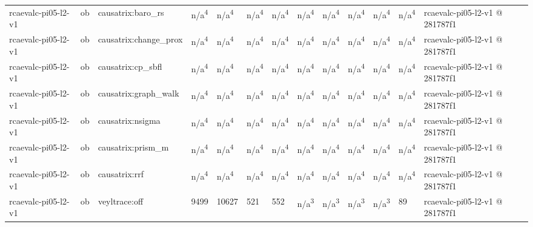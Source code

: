 \begin{table}[t]
\begin{tabular}{lllllllllllll}
rcaevalc-pi05-l2-v1 & ob & causatrix:baro\_rs & n/a\textsuperscript{4} & n/a\textsuperscript{4} & n/a\textsuperscript{4} & n/a\textsuperscript{4} & n/a\textsuperscript{4} & n/a\textsuperscript{4} & n/a\textsuperscript{4} & n/a\textsuperscript{4} & n/a\textsuperscript{4} & rcaevalc-pi05-l2-v1 @ 281787f1 \\
rcaevalc-pi05-l2-v1 & ob & causatrix:change\_prox & n/a\textsuperscript{4} & n/a\textsuperscript{4} & n/a\textsuperscript{4} & n/a\textsuperscript{4} & n/a\textsuperscript{4} & n/a\textsuperscript{4} & n/a\textsuperscript{4} & n/a\textsuperscript{4} & n/a\textsuperscript{4} & rcaevalc-pi05-l2-v1 @ 281787f1 \\
rcaevalc-pi05-l2-v1 & ob & causatrix:cp\_sbfl & n/a\textsuperscript{4} & n/a\textsuperscript{4} & n/a\textsuperscript{4} & n/a\textsuperscript{4} & n/a\textsuperscript{4} & n/a\textsuperscript{4} & n/a\textsuperscript{4} & n/a\textsuperscript{4} & n/a\textsuperscript{4} & rcaevalc-pi05-l2-v1 @ 281787f1 \\
rcaevalc-pi05-l2-v1 & ob & causatrix:graph\_walk & n/a\textsuperscript{4} & n/a\textsuperscript{4} & n/a\textsuperscript{4} & n/a\textsuperscript{4} & n/a\textsuperscript{4} & n/a\textsuperscript{4} & n/a\textsuperscript{4} & n/a\textsuperscript{4} & n/a\textsuperscript{4} & rcaevalc-pi05-l2-v1 @ 281787f1 \\
rcaevalc-pi05-l2-v1 & ob & causatrix:nsigma & n/a\textsuperscript{4} & n/a\textsuperscript{4} & n/a\textsuperscript{4} & n/a\textsuperscript{4} & n/a\textsuperscript{4} & n/a\textsuperscript{4} & n/a\textsuperscript{4} & n/a\textsuperscript{4} & n/a\textsuperscript{4} & rcaevalc-pi05-l2-v1 @ 281787f1 \\
rcaevalc-pi05-l2-v1 & ob & causatrix:prism\_m & n/a\textsuperscript{4} & n/a\textsuperscript{4} & n/a\textsuperscript{4} & n/a\textsuperscript{4} & n/a\textsuperscript{4} & n/a\textsuperscript{4} & n/a\textsuperscript{4} & n/a\textsuperscript{4} & n/a\textsuperscript{4} & rcaevalc-pi05-l2-v1 @ 281787f1 \\
rcaevalc-pi05-l2-v1 & ob & causatrix:rrf & n/a\textsuperscript{4} & n/a\textsuperscript{4} & n/a\textsuperscript{4} & n/a\textsuperscript{4} & n/a\textsuperscript{4} & n/a\textsuperscript{4} & n/a\textsuperscript{4} & n/a\textsuperscript{4} & n/a\textsuperscript{4} & rcaevalc-pi05-l2-v1 @ 281787f1 \\
rcaevalc-pi05-l2-v1 & ob & veyltrace:off & 9499 & 10627 & 521 & 552 & n/a\textsuperscript{3} & n/a\textsuperscript{3} & n/a\textsuperscript{3} & n/a\textsuperscript{3} & 89 & rcaevalc-pi05-l2-v1 @ 281787f1 \\

\end{tabular}
\end{table}
